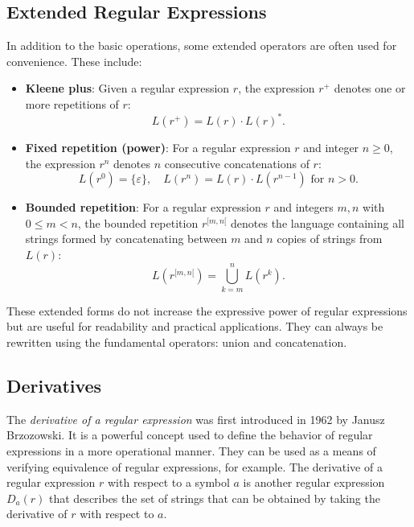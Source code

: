 


	
\subsection{Extended Regular Expressions}
\label{chap:prelim:extended_re}
In addition to the basic operations, some extended operators are often used for convenience. These include:

\begin{itemize}
    \item \textbf{Kleene plus}: Given a regular expression $r$, the expression $r^+$ denotes one or more repetitions of $r$:
    \[
    L(r^+) = L(r) \cdot L(r)^*.
    \]

    \item \textbf{Fixed repetition (power)}: For a regular expression $r$ and integer $n \geq 0$, the expression $r^n$ denotes $n$ consecutive concatenations of $r$:
    \[
    L(r^0) = \{ \varepsilon \}, \quad L(r^n) = L(r) \cdot L(r^{n-1}) \text{ for } n > 0.
    \]

	 \item \textbf{Bounded repetition}: For a regular expression $r$ and integers $m, n$ with $0 \leq m < n$, the bounded repetition $r^{[m,n[}$ denotes the language containing all strings formed by concatenating between $m$ and $n$ copies of strings from $L(r)$:
    \[
    L(r^{[m,n[}) = \bigcup_{k=m}^{n} L(r^k).
    \]
\end{itemize}

These extended forms do not increase the expressive power of regular expressions but are useful for readability and practical applications. They can always be rewritten using the fundamental operators: union and concatenation.

\subsection{Derivatives}
\label{chap:prelim:derivatives}
The \emph{derivative of a regular expression} was first introduced in 1962 by Janusz Brzozowski. It is a powerful concept used to define the behavior of regular expressions in a more operational manner. They can be used as a means of verifying equivalence of regular expressions, for example. The derivative of a regular expression $r$ with respect to a symbol $a$ is another regular expression $D_a(r)$ that describes the set of strings that can be obtained by taking the derivative of $r$ with respect to $a$.

